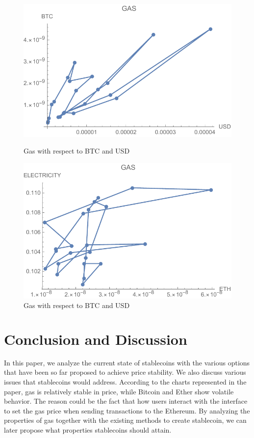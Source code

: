 \begin{figure}[!htb]
	\includegraphics[width=\linewidth]{figures/gas.pdf}
	\caption{Gas with respect to BTC and USD}\label{fig:gas}
	\endminipage\hfill
	\includegraphics[width=\linewidth]{figures/gasElectricity.pdf}
	\caption{Gas with respect to BTC and USD}\label{fig:gasElectricity}
	\endminipage\hfill
\end{figure}

\section{Conclusion and Discussion}
In this paper, we analyze the current state of stablecoins with the various options that have been so far proposed to achieve price stability. We also discuss various issues that stablecoins would address. According to the charts represented in the paper, gas is relatively stable in price, while Bitcoin and Ether show volatile behavior. The reason could be the fact that how users interact with the interface to set the gas price when sending transactions to the Ethereum. By analyzing the properties of gas together with the existing methods to create stablecoin, we can later propose what properties stablecoins should attain.

